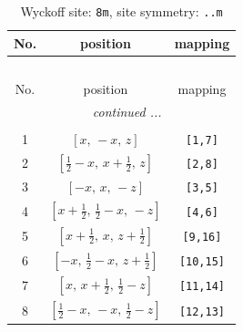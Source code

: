 \documentclass[fleqn,8pt]{jsarticle}
\begin{document}
\begin{longtable}{ccc}
\caption{Wyckoff site: {\tt 8m}, site symmetry: {\tt ..m}}
 \\
 \hline \hline
No. & position & mapping \\ \hline \endfirsthead

\multicolumn{2}{l}{\tablename\ \thetable{}} \\
 \hline \hline
No. & position & mapping \\ \hline \endhead

 \hline \hline
\multicolumn{2}{r}{\footnotesize\it continued ...} \\ \endfoot

 \hline \hline
\multicolumn{2}{r}{} \\ \endlastfoot

1 & $\left[ x,\, - x,\, z \right]$ & {\tt [1,7]} \\ \hline
2 & $\left[ \frac{1}{2} - x,\, x + \frac{1}{2},\, z \right]$ & {\tt [2,8]} \\ \hline
3 & $\left[ - x,\, x,\, - z \right]$ & {\tt [3,5]} \\ \hline
4 & $\left[ x + \frac{1}{2},\, \frac{1}{2} - x,\, - z \right]$ & {\tt [4,6]} \\ \hline
5 & $\left[ x + \frac{1}{2},\, x,\, z + \frac{1}{2} \right]$ & {\tt [9,16]} \\ \hline
6 & $\left[ - x,\, \frac{1}{2} - x,\, z + \frac{1}{2} \right]$ & {\tt [10,15]} \\ \hline
7 & $\left[ x,\, x + \frac{1}{2},\, \frac{1}{2} - z \right]$ & {\tt [11,14]} \\ \hline
8 & $\left[ \frac{1}{2} - x,\, - x,\, \frac{1}{2} - z \right]$ & {\tt [12,13]} \\
\end{longtable}
\renewcommand{\arraystretch}{1.2}
\end{document}
